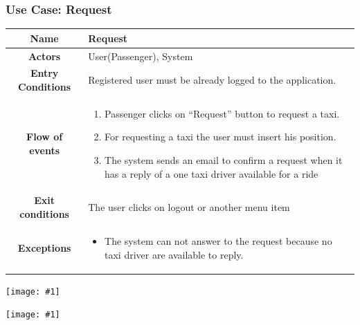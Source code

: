 \documentclass[11pt, a4paper,titlepage]{article}
\newcommand{\image}[1]{
	\begin{center}
		\noindent \texttt{[image: \#1]}
	\end{center}
	}
\begin{document}
\subsubsection{Use Case: Request}
		\begin{tabularx}{\textwidth}{| c | X |}
			\hline
			\textbf{Name} & 
			Request
			\\
			\hline
			\textbf{Actors} & 
			User(Passenger), System 
			\\
			\hline
			\textbf{Entry Conditions} &
			Registered user must be already logged to the application. 
			\\
			\hline
			\textbf{Flow of events} & 
			\begin{enumerate}
				\item Passenger clicks on “Request” button to request a taxi.
				\item For requesting a taxi the user must insert his position.
				\item The system sends an email to confirm a request when it has a reply of a one taxi driver available for a ride
				
			\end{enumerate}						
			\\
			\hline
			\textbf{Exit conditions} & 
			The user clicks on logout or another menu item
			\\
			\hline
			\textbf{Exceptions} & 
			\begin{itemize}
				\item The system can not answer to the request because no taxi driver are available to reply.
			\end{itemize} 
			\\
			\hline		
		\end{tabularx}
		\image{usecase_request.png}
		\image{diagram_sequence_request.png}
		\newpage
\end{document}
